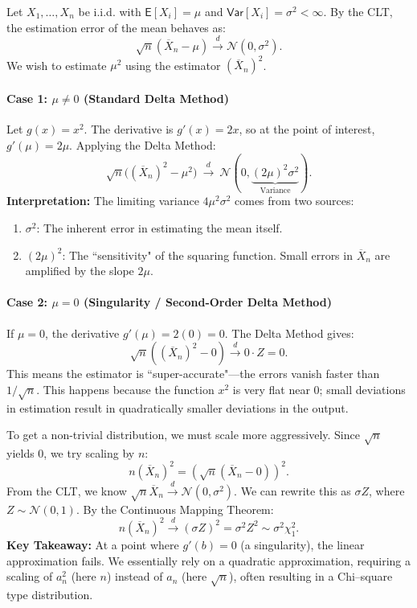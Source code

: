 \begin{ex}
    
Let $X_1, \dots, X_n$ be i.i.d. with $\mathsf{E}[X_i] = \mu$ and $\mathsf{Var}[X_i] = \sigma^2 < \infty$. By the CLT, the estimation error of the mean behaves as:
\[ \sqrt{n}(\overline{X}_n - \mu) \stackrel{d}{\longrightarrow} \mathcal{N}(0, \sigma^2). \]
We wish to estimate $\mu^2$ using the estimator $(\overline{X}_n)^2$.

\paragraph{Case 1: $\mu \neq 0$ (Standard Delta Method)}
Let $g(x) = x^2$. The derivative is $g'(x) = 2x$, so at the point of interest, $g'(\mu) = 2\mu$.
Applying the Delta Method:
\[ \sqrt{n}\Big((\overline{X}_n)^2-\mu^2\Big) \ \stackrel{d}{\longrightarrow} \ \mathcal{N}(0, \underbrace{(2\mu)^2 \sigma^2}_{\text{Variance}}). \]
\textbf{Interpretation:} The limiting variance $4\mu^2\sigma^2$ comes from two sources:
\begin{enumerate}
    \item $\sigma^2$: The inherent error in estimating the mean itself.
    \item $(2\mu)^2$: The ``sensitivity" of the squaring function. Small errors in $\overline{X}_n$ are amplified by the slope $2\mu$.
\end{enumerate}

\paragraph{Case 2: $\mu = 0$ (Singularity / Second-Order Delta Method)}
If $\mu=0$, the derivative $g'(\mu) = 2(0) = 0$. The Delta Method gives:
\[ \sqrt{n}((\overline{X}_n)^2 - 0) \xrightarrow{d} 0 \cdot Z = 0. \]
This means the estimator is ``super-accurate"—the errors vanish faster than $1/\sqrt{n}$. This happens because the function $x^2$ is very flat near 0; small deviations in estimation result in quadratically smaller deviations in the output.

To get a non-trivial distribution, we must scale more aggressively. Since $\sqrt{n}$ yields 0, we try scaling by $n$:
\[ n(\overline{X}_n)^2 = \left( \sqrt{n}(\overline{X}_n - 0) \right)^2. \]
From the CLT, we know $\sqrt{n}\overline{X}_n \xrightarrow{d} \mathcal{N}(0, \sigma^2)$. We can rewrite this as $\sigma Z$, where $Z \sim \mathcal{N}(0,1)$. By the Continuous Mapping Theorem:
\[ n(\overline{X}_n)^2 \xrightarrow{d} (\sigma Z)^2 = \sigma^2 Z^2 \sim \sigma^2 \chi^2_1. \]
\textbf{Key Takeaway:} At a point where $g'(b)=0$ (a singularity), the linear approximation fails. We essentially rely on a quadratic approximation, requiring a scaling of $a_n^2$ (here $n$) instead of $a_n$ (here $\sqrt{n}$), often resulting in a Chi--square type distribution.
\end{ex}

